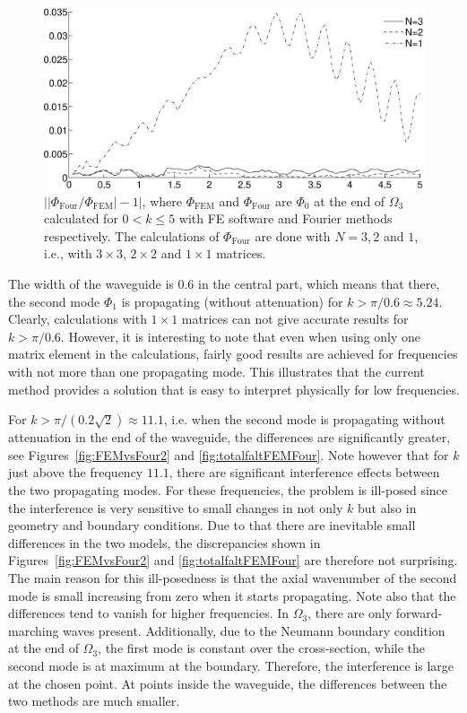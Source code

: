 \documentclass[numreferences]{kluwer}
\providecommand{\abs}[1]{\left\lvert#1\right\rvert}
\renewcommand{\Phi}{\varPhi}
\renewcommand{\Phi}{\varPhi}
\begin{document}
\begin{figure}[htb]
  \centering
  \includegraphics[width=\linewidth]{relerr123}
  \caption{$\abs{\abs{\Phi_{\text{Four}}/\Phi_{\text{FEM}}}-1}$, where
    $\Phi_{\text{FEM}}$ and $\Phi_{\text{Four}}$ are $\Phi_0$ at the
    end of $\Omega_3$ calculated for $0<k\le5$ with FE software and
    Fourier methods respectively. The calculations of
    $\Phi_{\text{Four}}$ are done with $N=3,2$ and $1$, i.e., with
    $3\times3$, $2\times2$ and $1\times1$ matrices.}
  \label{fig:relerr123}
\end{figure}

The width of the waveguide is $0.6$ in the central part, which means
that there, the second mode $\Phi_1$ is propagating (without
attenuation) for $k>\pi/0.6\approx5.24$. Clearly, calculations with
$1\times1$ matrices can not give accurate results for $k>\pi/0.6$.
However, it is interesting to note that even when using only one
matrix element in the calculations, fairly good results are achieved
for frequencies with not more than one propagating mode. This
illustrates that the current method provides a solution that is easy
to interpret physically for low frequencies.

For $k>\pi/(0.2\sqrt2)\approx11.1$, i.e. when the second mode is
propagating without attenuation in the end of the waveguide, the
differences are significantly greater, see
Figures~\ref{fig:FEMvsFour2} and \ref{fig:totalfaltFEMFour}. Note
however that for $k$ just above the frequency $11.1$, there are
significant interference effects between the two propagating
modes. For these frequencies, the problem is ill-posed since the
interference is very sensitive to small changes in not only $k$ but
also in geometry and boundary conditions. Due to that there are
inevitable small differences in the two models, the discrepancies
shown in Figures~\ref{fig:FEMvsFour2} and \ref{fig:totalfaltFEMFour}
are therefore not surprising. The main reason for this ill-posedness
is that the axial wavenumber of the second mode is small increasing
from zero when it starts propagating. Note also that the differences
tend to vanish for higher frequencies.  In $\Omega_3$, there are only
forward-marching waves present. Additionally, due to the Neumann
boundary condition at the end of $\Omega_3$, the first mode is
constant over the cross-section, while the second mode is at maximum
at the boundary. Therefore, the interference is large at the chosen
point. At points inside the waveguide, the differences between the two
methods are much smaller.
\end{document}
